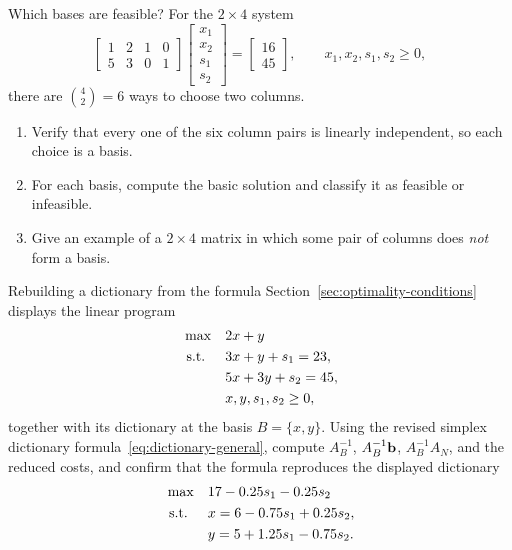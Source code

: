 \begin{ex}{Which bases are feasible?}{}
\label{ex:matrix-feasible-bases}
 For the \( 2 \times 4 \) system
\[
\begin{bmatrix}
    1 & 2 & 1 & 0 \\
    5 & 3 & 0 & 1
\end{bmatrix}
\begin{bmatrix}
    x_1 \\ x_2 \\ s_1 \\ s_2
\end{bmatrix}
=
\begin{bmatrix}
    16 \\ 45
\end{bmatrix},
\qquad x_1, x_2, s_1, s_2 \geq 0,
\]
there are \( \binom{4}{2} = 6 \) ways to choose two columns.
\begin{enumerate}
    \item Verify that every one of the six column pairs is linearly independent, so each choice is a basis.
    \item For each basis, compute the basic solution and classify it as feasible or infeasible.
    \item Give an example of a \( 2 \times 4 \) matrix in which some pair of columns does \emph{not} form a basis.
\end{enumerate}
\end{ex}

\begin{ex}{Rebuilding a dictionary from the formula}{}
\label{ex:matrix-dictionary-formula}
 Section~\ref{sec:optimality-conditions} displays the linear program
\[
\begin{aligned}
\max\quad & 2x + y \\
\mbox{ s.t. }\quad & 3x + y + s_1 = 23,\\
& 5x + 3y + s_2 = 45,\\
& x, y, s_1, s_2 \ge 0,
\end{aligned}
\]
together with its dictionary at the basis \( B = \{x, y\} \).  Using the revised simplex dictionary formula~\eqref{eq:dictionary-general}, compute \( A_B^{-1} \), \( A_B^{-1}\mathbf{b} \), \( A_B^{-1}A_N \), and the reduced costs, and confirm that the formula reproduces the displayed dictionary
\[
\begin{aligned}
\max\quad & 17 - 0.25s_1 - 0.25s_2 \\
\mbox{ s.t. }\quad & x = 6 - 0.75s_1 + 0.25s_2,\\
& y = 5 + 1.25s_1 - 0.75s_2.
\end{aligned}
\]
\exrefs{\S\ref{sec:optimality-conditions}}
\end{ex}

